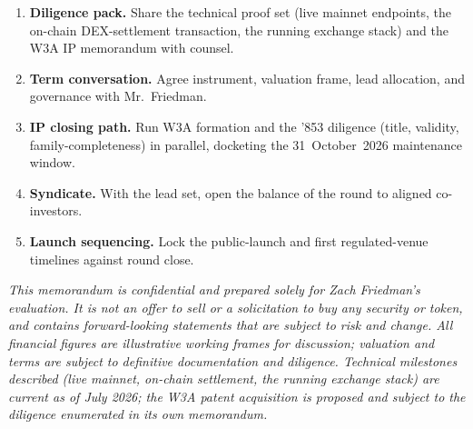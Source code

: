 \documentclass[11pt,a4paper]{article}
\begin{document}
\begin{enumerate}[leftmargin=1.6em]
  \item \textbf{Diligence pack.} Share the technical proof set (live mainnet
  endpoints, the on-chain DEX-settlement transaction, the running exchange
  stack) and the W3A IP memorandum with counsel.
  \item \textbf{Term conversation.} Agree instrument, valuation frame, lead
  allocation, and governance with Mr.\ Friedman.
  \item \textbf{IP closing path.} Run W3A formation and the '853 diligence
  (title, validity, family-completeness) in parallel, docketing the
  31~October~2026 maintenance window.
  \item \textbf{Syndicate.} With the lead set, open the balance of the round
  to aligned co-investors.
  \item \textbf{Launch sequencing.} Lock the public-launch and first
  regulated-venue timelines against round close.
\end{enumerate}

\vspace{1.5em}
\noindent\textit{This memorandum is confidential and prepared solely for
Zach Friedman's evaluation. It is not an offer to sell or a solicitation to
buy any security or token, and contains forward-looking statements that are
subject to risk and change. All financial figures are illustrative working
frames for discussion; valuation and terms are subject to definitive
documentation and diligence. Technical milestones described (live mainnet,
on-chain settlement, the running exchange stack) are current as of July
2026; the W3A patent acquisition is proposed and subject to the diligence
enumerated in its own memorandum.}
\end{document}
